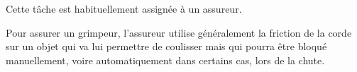 \documentclass[a4paper,10pt,french]{scrartcl}
\begin{document}
Cette tâche est habituellement assignée à un assureur.

Pour assurer un grimpeur, l'assureur utilise généralement la friction de la corde sur un objet qui va lui permettre de coulisser mais qui pourra être bloqué manuellement, voire automatiquement dans certains cas, lors de la chute.






%
%
%
%

%
%
%
%
%
\end{document}
